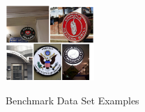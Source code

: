 \begin{figure}[h]
        {\includegraphics[width=0.30\textwidth]{img/Dataset-Examples/Total-Text-examples.png}}
    \caption{Benchmark Data Set Examples\label{fig:dataset-examples}}
\end{figure}
